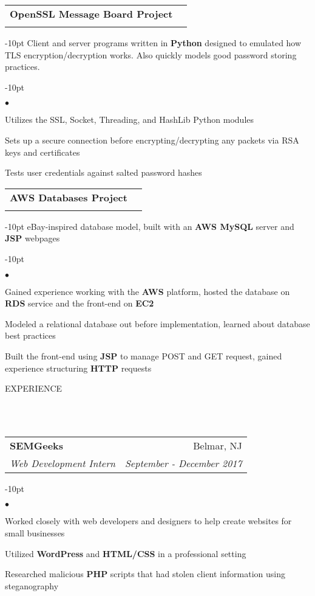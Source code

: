 \documentclass[12pt]{article}
\makeatletter
\newcommand{\header}[1]{
	\vspace*{12pt} %
	{\hspace*{-14pt}\vspace*{6pt} #1}
	\vspace*{-6pt} 
	\lineunder
}
\newcommand{\lineunder}{
	\vspace*{-8pt} \\ 
	\hspace*{-18pt} 
	\hrulefill \\
}
\newcommand{\subheading}[4]{
 	\vspace{5pt}
    	\begin{tabular*}{1.01\textwidth}
    		{l@{\extracolsep{\fill}}r}
      		\hspace{-16pt}\textbf{#1} & #2 \\
      		\hspace{-16pt}\textit{\small#3} & \textit{\small #4} \\
    	\end{tabular*}
    \vspace{-4pt}
}
\newenvironment{achievements}{
\begin{adjustwidth}{-10pt}{}
  \begin{list}{$\bullet$}{
  	\topsep 0pt \itemsep -4pt}}
  	{\vspace*{2pt}\end{list}
\end{adjustwidth}
}
\makeatother
\begin{document}
\subheading{OpenSSL Message Board Project}{}{}{}
	\vspace{-15pt}
	\begin{adjustwidth}{-10pt}{}
	Client and server programs written in \textbf{Python} designed to emulated how TLS encryption/decryption works. Also quickly models good password storing practices.
	\end{adjustwidth}
	\begin{achievements}
		\item Utilizes the SSL, Socket, Threading, and HashLib Python modules
		\item Sets up a secure connection before encrypting/decrypting any packets via RSA keys and certificates
		\item Tests user credentials against salted password hashes
	\end{achievements}

\subheading{AWS Databases Project}{}{}{}
	\vspace{-15pt}
	\begin{adjustwidth}{-10pt}{}
	eBay-inspired database model, built with an \textbf{AWS MySQL} server and \textbf{JSP} webpages
	\end{adjustwidth}
	\begin{achievements}
		\item Gained experience working with the \textbf{AWS} platform, hosted the database on \textbf{RDS} service and the front-end on \textbf{EC2}
		\item Modeled a relational database out before implementation, learned about database best practices
		\item Built the front-end using \textbf{JSP} to manage POST and GET request, gained experience structuring \textbf{HTTP} requests
	\end{achievements} 


\header{EXPERIENCE}

\subheading
	{SEMGeeks}{Belmar, NJ}
	{Web Development Intern}{September - December 2017}
	\begin{achievements}
		\item Worked closely with web developers and designers to help create websites for small businesses
		\item Utilized \textbf{WordPress} and \textbf{HTML/CSS} in a professional setting
		\item Researched malicious \textbf{PHP} scripts that had stolen client information using steganography
	\end{achievements}
\end{document}
